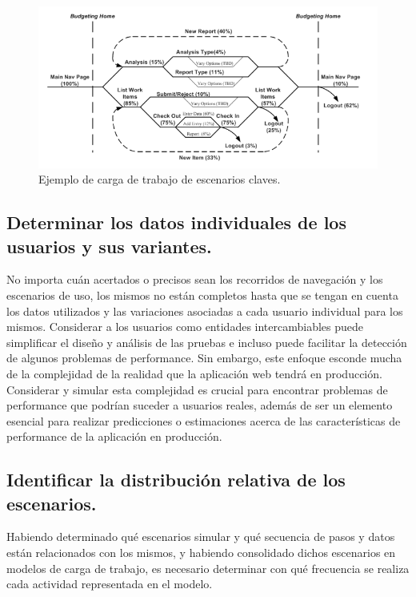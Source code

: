 \begin{figure}[h!]
\centering
\includegraphics[width=1\textwidth]{figuras/libro_azul/diagrama_recorrido_escenario.png}
	\caption{Ejemplo de carga de trabajo de escenarios claves.}
  	\label{fig.diagrama_escenario}
\end{figure}

\subsection{Determinar los datos individuales de los usuarios y sus variantes.}

No importa cuán acertados o precisos sean los recorridos de navegación y los escenarios de uso, los mismos no están completos hasta que se tengan en cuenta los datos utilizados
y las variaciones asociadas a cada usuario individual para los mismos. Considerar a los usuarios como entidades intercambiables puede simplificar el diseño y análisis de las pruebas
e incluso puede facilitar la detección de algunos problemas de performance. Sin embargo, este enfoque esconde mucha de la complejidad de la realidad que la aplicación web tendrá en producción.
Considerar y simular esta complejidad es crucial para encontrar problemas de performance que podrían suceder a usuarios reales, además de ser un elemento esencial para realizar
predicciones o estimaciones acerca de las características de performance de la aplicación en producción.  

\subsection{Identificar la distribución relativa de los escenarios.}
Habiendo determinado qué escenarios simular y qué secuencia de pasos y datos están relacionados con los mismos, y habiendo consolidado dichos escenarios en modelos de carga
de trabajo, es necesario determinar con qué frecuencia se realiza cada actividad representada en el modelo.

